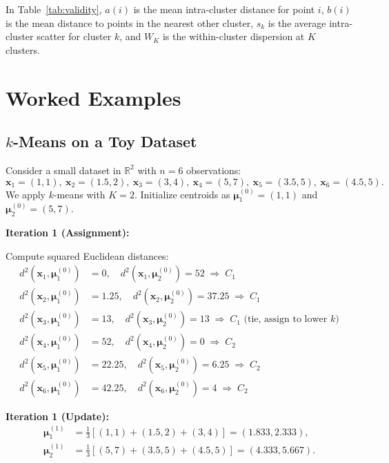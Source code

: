 \documentclass[conference]{IEEEtran}
\begin{document}
In Table~\ref{tab:validity}, $a(i)$ is the mean intra-cluster distance for point $i$, $b(i)$ is the mean distance to points in the nearest other cluster, $s_k$ is the average intra-cluster scatter for cluster $k$, and $W_K$ is the within-cluster dispersion at $K$ clusters.

\section{Worked Examples}
\label{sec:examples}

\subsection{$k$-Means on a Toy Dataset}

Consider a small dataset in $\mathbb{R}^2$ with $n=6$ observations:
\[
\mathbf{x}_1=(1,1),\ \mathbf{x}_2=(1.5,2),\ \mathbf{x}_3=(3,4),\ \mathbf{x}_4=(5,7),\ \mathbf{x}_5=(3.5,5),\ \mathbf{x}_6=(4.5,5).
\]
We apply $k$-means with $K=2$. Initialize centroids as $\boldsymbol{\mu}_1^{(0)}=(1,1)$ and $\boldsymbol{\mu}_2^{(0)}=(5,7)$.

\textbf{Iteration 1 (Assignment):}

Compute squared Euclidean distances:
\begin{align*}
d^2(\mathbf{x}_1, \boldsymbol{\mu}_1^{(0)}) &= 0, \quad d^2(\mathbf{x}_1, \boldsymbol{\mu}_2^{(0)}) = 52 \;\Rightarrow\; C_1\\
d^2(\mathbf{x}_2, \boldsymbol{\mu}_1^{(0)}) &= 1.25, \quad d^2(\mathbf{x}_2, \boldsymbol{\mu}_2^{(0)}) = 37.25 \;\Rightarrow\; C_1\\
d^2(\mathbf{x}_3, \boldsymbol{\mu}_1^{(0)}) &= 13, \quad d^2(\mathbf{x}_3, \boldsymbol{\mu}_2^{(0)}) = 13 \;\Rightarrow\; C_1 \text{ (tie, assign to lower $k$)}\\
d^2(\mathbf{x}_4, \boldsymbol{\mu}_1^{(0)}) &= 52, \quad d^2(\mathbf{x}_4, \boldsymbol{\mu}_2^{(0)}) = 0 \;\Rightarrow\; C_2\\
d^2(\mathbf{x}_5, \boldsymbol{\mu}_1^{(0)}) &= 22.25, \quad d^2(\mathbf{x}_5, \boldsymbol{\mu}_2^{(0)}) = 6.25 \;\Rightarrow\; C_2\\
d^2(\mathbf{x}_6, \boldsymbol{\mu}_1^{(0)}) &= 42.25, \quad d^2(\mathbf{x}_6, \boldsymbol{\mu}_2^{(0)}) = 4 \;\Rightarrow\; C_2
\end{align*}

\textbf{Iteration 1 (Update):}
\begin{align*}
\boldsymbol{\mu}_1^{(1)} &= \frac{1}{3}[(1,1)+(1.5,2)+(3,4)] = (1.833, 2.333),\\
\boldsymbol{\mu}_2^{(1)} &= \frac{1}{3}[(5,7)+(3.5,5)+(4.5,5)] = (4.333, 5.667).
\end{align*}
\end{document}
